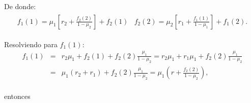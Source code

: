 \documentclass{article}
\numberwithin{equation}{section}
\begin{document}
De donde:
\begin{eqnarray*}
\begin{array}{ll}
f_{1}\left(1\right)=\mu_{1}\left[r_{2}+\frac{f_{2}\left(2\right)}{1-\mu_{2}}\right]+f_{2}\left(1\right)&
f_{2}\left(2\right)=\mu_{2}\left[r_{1}+\frac{f_{1}\left(1\right)}{1-\mu_{1}}\right]+f_{1}\left(2\right).
\end{array}
\end{eqnarray*}

Resolviendo para $f_{1}\left(1\right)$:
\begin{eqnarray*}
f_{1}\left(1\right)&=&r_{2}\mu_{1}+f_{2}\left(1\right)+f_{2}\left(2\right)\frac{\mu_{1}}{1-\mu_{2}}=r_{2}\mu_{1}+r_{1}\mu_{1}+f_{2}\left(2\right)\frac{\mu_{1}}{1-\mu_{2}}\\
&=&\mu_{1}\left(r_{2}+r_{1}\right)+f_{2}\left(2\right)\frac{\mu_{1}}{1-\mu_{2}}=\mu_{1}\left(r+\frac{f_{2}\left(2\right)}{1-\mu_{2}}\right),\\
\end{eqnarray*}

entonces
\end{document}
